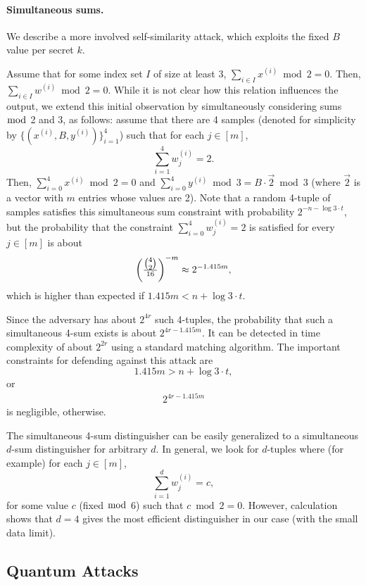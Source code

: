 \documentclass[orivec,envcountsect]{llncs}
\begin{document}
\paragraph{Simultaneous sums.}

We describe a more involved self-similarity attack, which exploits the fixed $B$ value per secret $k$.

Assume that for some index set $I$ of size at least 3, $\sum_{i \in I} x^{(i)} \bmod 2 = 0$. Then, $\sum_{i \in I} w^{(i)} \bmod 2 = 0$. While it is not clear how this relation influences the output,
we extend this initial observation by simultaneously considering sums $\bmod$ 2 and 3, as follows:
assume that there are 4 samples (denoted for simplicity
by $ \{(x^{(i)},B,y^{(i)})\}_{i=1}^{4}$) such that for each $j \in [m]$,
$$\sum_{i = 1}^{4} w^{(i)}_j = 2.$$
Then, $\sum_{i = 0}^{4} x^{(i)} \bmod 2 = 0$ and $\sum_{i = 0}^{4} y^{(i)} \bmod 3 = B \cdot \vec{2} \bmod 3$ (where $\vec{2}$ is a vector with $m$ entries whose values are 2).
Note that a random 4-tuple of samples satisfies this simultaneous sum constraint with probability
$2^{-n - \log 3 \cdot t}$, but the probability that the constraint $\sum_{i = 0}^{4} w^{(i)}_j = 2$ is satisfied for every $j \in [m]$ is about
$$\left( \tfrac{\tbinom{4}{2}}{16} \right) ^{-m} \approx 2^{- 1.415 m},$$
which is higher than expected if $1.415 m < n + \log 3 \cdot t $.

Since the adversary has about $2^{4r}$ such 4-tuples, the probability that such a simultaneous 4-sum exists is about $2^{4r - 1.415 m}$. It can be detected in time complexity of about $2^{2r}$ using a standard matching algorithm. The important constraints for defending against this attack are
$$1.415 m > n + \log 3 \cdot t,$$ or
\begin{align}
\label{eq:sim}
2^{4r - 1.415 m}
\end{align}
is negligible, otherwise.

The simultaneous 4-sum distinguisher can be easily generalized to a
simultaneous $d$-sum distinguisher for arbitrary $d$.
In general, we look for $d$-tuples where (for example)
for each $j \in [m]$, $$\sum_{i = 1}^{d} w^{(i)}_j = c,$$
for some value $c$ (fixed $\bmod$ 6) such that $c \bmod 2 = 0$.
However, calculation shows that $d = 4$ gives the most efficient
distinguisher in our case (with the small data limit).



\subsection{Quantum Attacks}
\end{document}
